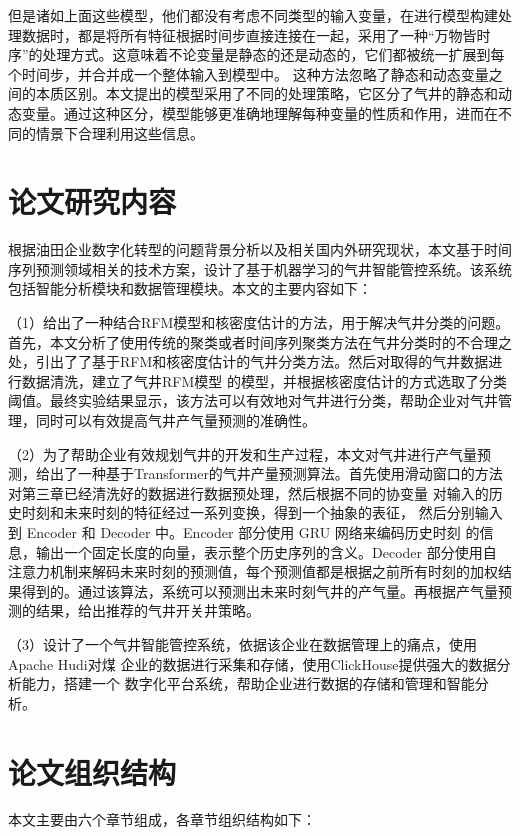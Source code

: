 但是诸如上面这些模型，他们都没有考虑不同类型的输入变量，在进行模型构建处理数据时，都是将所有特征根据时间步直接连接在一起，采用了一种“万物皆时序”的处理方式。这意味着不论变量是静态的还是动态的，它们都被统一扩展到每个时间步，并合并成一个整体输入到模型中。
这种方法忽略了静态和动态变量之间的本质区别。本文提出的模型采用了不同的处理策略，它区分了气井的静态和动态变量。通过这种区分，模型能够更准确地理解每种变量的性质和作用，进而在不同的情景下合理利用这些信息。
\section{论文研究内容}
根据油田企业数字化转型的问题背景分析以及相关国内外研究现状，本文基于时间序列预测领域相关的技术方案，设计了基于机器学习的气井智能管控系统。该系统包括智能分析模块和数据管理模块。本文的主要内容如下：

（1）给出了一种结合RFM模型和核密度估计的方法，用于解决气井分类的问题。首先，本文分析了使用传统的聚类或者时间序列聚类方法在气井分类时的不合理之处，引出了了基于RFM和核密度估计的气井分类方法。然后对取得的气井数据进行数据清洗，建立了气井RFM模型
的模型，并根据核密度估计的方式选取了分类阈值。最终实验结果显示，该方法可以有效地对气井进行分类，帮助企业对气井管理，同时可以有效提高气井产气量预测的准确性。

（2）为了帮助企业有效规划气井的开发和生产过程，本文对气井进行产气量预测，给出了一种基于Transformer的气井产量预测算法。首先使用滑动窗口的方法对第三章已经清洗好的数据进行数据预处理，然后根据不同的协变量
对输入的历史时刻和未来时刻的特征经过一系列变换，得到一个抽象的表征，
然后分别输入到 Encoder 和 Decoder 中。Encoder 部分使用 GRU 网络来编码历史时刻
的信息，输出一个固定长度的向量，表示整个历史序列的含义。Decoder 部分使用自
注意力机制来解码未来时刻的预测值，每个预测值都是根据之前所有时刻的加权结
果得到的。通过该算法，系统可以预测出未来时刻气井的产气量。再根据产气量预测的结果，给出推荐的气井开关井策略。

（3）设计了一个气井智能管控系统，依据该企业在数据管理上的痛点，使用Apache Hudi对煤
企业的数据进行采集和存储，使用ClickHouse提供强大的数据分析能力，搭建一个
数字化平台系统，帮助企业进行数据的存储和管理和智能分析。
\section{论文组织结构}
本文主要由六个章节组成，各章节组织结构如下：

